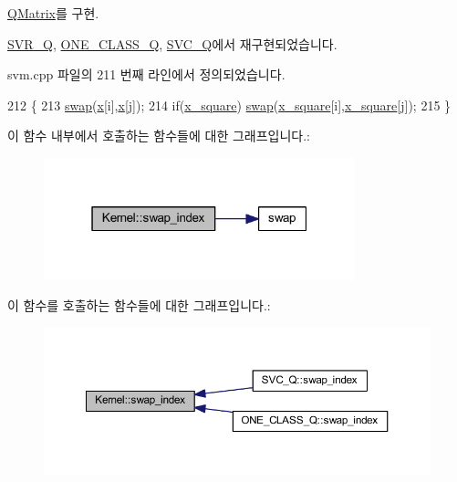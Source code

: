 \hyperlink{class_q_matrix_acb4e256ebe3008dff0d4b5414102dbe7}{Q\+Matrix}를 구현.



\hyperlink{class_s_v_r___q_a9d3884f0c68f4ce18d47570e4a203405}{S\+V\+R\+\_\+\+Q}, \hyperlink{class_o_n_e___c_l_a_s_s___q_ad8bc86ca742c27d82718346388f83fad}{O\+N\+E\+\_\+\+C\+L\+A\+S\+S\+\_\+\+Q}, \hyperlink{class_s_v_c___q_a9c889db8ee0156ed5bcdaa4d6bc4e245}{S\+V\+C\+\_\+\+Q}에서 재구현되었습니다.



svm.\+cpp 파일의 211 번째 라인에서 정의되었습니다.


\begin{DoxyCode}
212     \{
213         \hyperlink{svm_8cpp_a91e77fa16b1c9bbbf90f2eea392997b1}{swap}(\hyperlink{class_kernel_a725a35660c4309605c2628fa8290ce5f}{x}[i],\hyperlink{class_kernel_a725a35660c4309605c2628fa8290ce5f}{x}[j]);
214         \textcolor{keywordflow}{if}(\hyperlink{class_kernel_a97ca8abb41cd6ba8b1553738d59352d5}{x\_square}) \hyperlink{svm_8cpp_a91e77fa16b1c9bbbf90f2eea392997b1}{swap}(\hyperlink{class_kernel_a97ca8abb41cd6ba8b1553738d59352d5}{x\_square}[i],\hyperlink{class_kernel_a97ca8abb41cd6ba8b1553738d59352d5}{x\_square}[j]);
215     \}
\end{DoxyCode}


이 함수 내부에서 호출하는 함수들에 대한 그래프입니다.\+:
\nopagebreak
\begin{figure}[H]
\begin{center}
\leavevmode
\includegraphics[width=256pt]{class_kernel_adca807c5584bc42fd098cd9eb1f19621_cgraph}
\end{center}
\end{figure}




이 함수를 호출하는 함수들에 대한 그래프입니다.\+:
\nopagebreak
\begin{figure}[H]
\begin{center}
\leavevmode
\includegraphics[width=350pt]{class_kernel_adca807c5584bc42fd098cd9eb1f19621_icgraph}
\end{center}
\end{figure}




